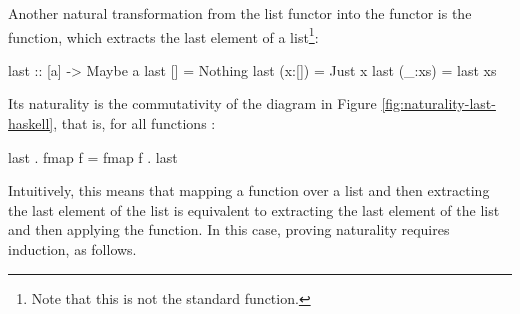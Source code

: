 \begin{example}
  \label{ex:natural-last-haskell}

  Another natural transformation from the list functor into the
   functor is the  function,
  which extracts the last element of a list\footnote{Note that this is
    not the standard  function.}:
  \begin{codehaskell}
last :: [a] -> Maybe a
last []     = Nothing
last (x:[]) = Just x
last (_:xs) = last xs
  \end{codehaskell}
  Its naturality is the commutativity of the diagram in Figure
  \ref{fig:naturality-last-haskell}, that is, for all functions
  :
  \begin{codehaskell}
last . fmap f = fmap f . last
  \end{codehaskell}
  Intuitively, this means that mapping a function over a list and then
  extracting the last element of the list is equivalent to extracting
  the last element of the list and then applying the function. In this
  case, proving naturality requires induction, as follows.

  \vspace{1em}
  \case{\texthaskell{[]}}
  \begin{steps}
  \end{steps}
  \case{\texthaskell{[x]}}
  \begin{steps}
  \end{steps}
  \begin{steps}
      \eqbyihh{}
  \end{steps}


\end{example}
